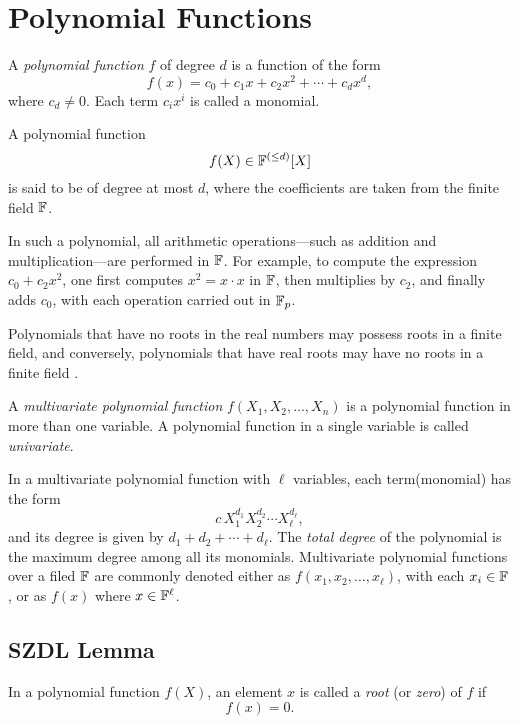 \chapter{Polynomial Functions}
\begin{definition}
    A \textit{polynomial function} $f$ of degree $d$ is a function of the form
    \[
        f(x) = c_0 + c_1 x + c_2 x^2 + \cdots + c_d x^d,
    \]
    where $c_d \neq 0$. Each term $c_i x^i$ is called a monomial.
\end{definition}

A polynomial function
\[
    f(X) \in \mathbb{F}^{(\leq d)}[X]
\]
is said to be of degree at most $d$, where the coefficients are taken from the finite field $\mathbb{F}$.

In such a polynomial, all arithmetic operations—such as addition and multiplication—are performed in $\mathbb{F}$. 
For example, to compute the expression $c_0 + c_2 x^2$, one first computes $x^2 = x \cdot x$ in $\mathbb{F}$, 
then multiplies by $c_2$, and finally adds $c_0$, with each operation carried out in $\mathbb{F}_p$.

\begin{remark}
    Polynomials that have no roots in the real numbers may possess roots in a finite field, 
    and conversely, polynomials that have real roots may have no roots in a finite field \cite{rareskills_finitefields}.
\end{remark}

\begin{definition}
    A \textit{multivariate polynomial function} $f(X_1, X_2, \ldots, X_n)$ is a polynomial function in more than one variable. 
    A polynomial function in a single variable is called \textit{univariate}.
\end{definition}

In a multivariate polynomial function with $\ell$ variables, each term(monomial) has the form 
\[
    c \, X_1^{d_1} X_2^{d_2} \cdots X_{\ell}^{d_{\ell}},
\]
and its degree is given by $d_1 + d_2 + \cdots + d_{\ell}$. 
The \textit{total degree} of the polynomial is the maximum degree among all its monomials. 
Multivariate polynomial functions over a filed $\mathbb{F}$ are commonly denoted either as $f(x_1, x_2, \ldots, x_{\ell})$, with each $x_i \in \mathbb{F}$, or as $f(x)$ where $x \in \mathbb{F}^{\ell}$.


\section{SZDL Lemma}
\begin{definition}
    In a polynomial function $f(X)$, an element $x$ is called a \textit{root} (or \textit{zero}) of $f$ if
    \[
        f(x) = 0.
    \]
\end{definition}


